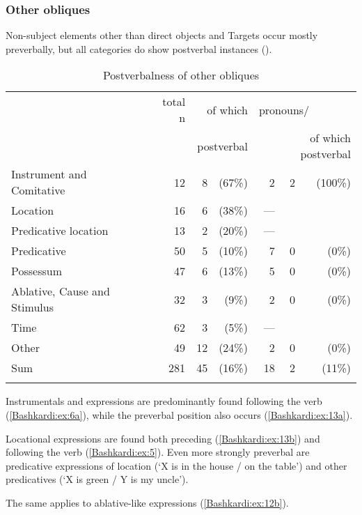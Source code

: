 \documentclass[output=paper,colorlinks,citecolor=brown]{langscibook}
\begin{document}
\subsubsection{Other obliques}\label{Bashkardi:ss:2.4.3}

Non-subject elements other than direct objects and Targets occur mostly preverbally, but all categories do show postverbal instances ().

\begin{table}
    \centering
    \begin{tabular}{lrrrrrr}
\lsptoprule
& total n & \multicolumn{2}{r}{of which} & \multicolumn{3}{l}{pronouns/} \\
& & \multicolumn{2}{r}{postverbal} & \multicolumn{3}{r}{of which postverbal} \\
\midrule
Instrument and Comitative & 12 & 8 & (67\%) & 2 & 2 & (100\%) \\
\midrule
Location & 16 & 6 & (38\%) & --- & & \\
Predicative location & 13 & 2 & (20\%) & --- & & \\
\midrule
Predicative & 50 & 5 & (10\%) & 7 & 0 & (0\%) \\
Possessum & 47 & 6  & (13\%) & 5 & 0 & (0\%) \\
Ablative, Cause and Stimulus & 32 & 3 & (9\%) & 2 & 0 & (0\%) \\
\midrule
Time & 62 & 3 & (5\%) & --- & & \\
Other & 49 & 12 & (24\%) & 2 & 0 & (0\%) \\
\midrule
Sum & 281 & 45 & (16\%) & 18 & 2 & (11\%) \\
\lspbottomrule
    \end{tabular}
    \caption{Postverbalness of other obliques{\protect\footnotemark[19]}}
    \label{Bashkardi:tab:3}
\end{table}

Instrumentals and  expressions are predominantly found following the verb (\ref{Bashkardi:ex:6a}), while the preverbal position also occurs (\ref{Bashkardi:ex:13a}). 

Locational expressions are found both preceding (\ref{Bashkardi:ex:13b}) and following the verb (\ref{Bashkardi:ex:5}). Even more strongly preverbal are predicative expressions of location (`X is in the house / on the table') and other predicatives (`X is green / Y is my uncle'). 

The same applies to ablative-like expressions (\ref{Bashkardi:ex:12b}). 
\end{document}
